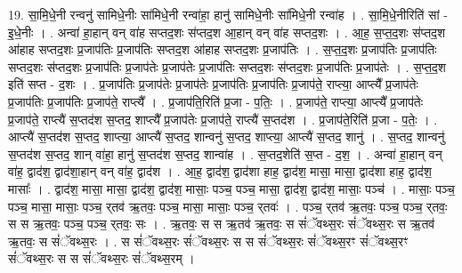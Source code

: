 \documentclass[17pt]{extarticle}
\begin{document}
19. सा॒मि॒धे॒नी रन्वनु॑ सामिधे॒नीः सा॑मिधे॒नी रन्वा॑हा॒ हानु॑ सामिधे॒नीः सा॑मिधे॒नी रन्वा॑ह । . सा॒मि॒धे॒नीरिति॑ सां - इ॒धे॒नीः । . अन्वा॑ हा॒हान् वन् वा॑ह सप्तद॒शः स॑प्तद॒श आ॒हान् वन् वा॑ह सप्तद॒शः । . आ॒ह॒ स॒प्त॒द॒शः स॑प्तद॒श आ॑हाह सप्तद॒शः प्र॒जाप॑तिः प्र॒जाप॑तिः सप्तद॒श आ॑हाह सप्तद॒शः प्र॒जाप॑तिः । . स॒प्त॒द॒शः प्र॒जाप॑तिः प्र॒जाप॑तिः सप्तद॒शः स॑प्तद॒शः प्र॒जाप॑तिः प्र॒जाप॑तेः प्र॒जाप॑तेः प्र॒जाप॑तिः सप्तद॒शः स॑प्तद॒शः प्र॒जाप॑तिः प्र॒जाप॑तेः । . स॒प्त॒द॒श इति॑ सप्त - द॒शः । . प्र॒जाप॑तिः प्र॒जाप॑तेः प्र॒जाप॑तेः प्र॒जाप॑तिः प्र॒जाप॑तिः प्र॒जाप॑ते॒ राप्त्या॒ आप्त्यै᳚ प्र॒जाप॑तेः प्र॒जाप॑तिः प्र॒जाप॑तिः प्र॒जाप॑ते॒ राप्त्यै᳚ । . प्र॒जाप॑ति॒रिति॑ प्र॒जा - प॒तिः॒ । . प्र॒जाप॑ते॒ राप्त्या॒ आप्त्यै᳚ प्र॒जाप॑तेः प्र॒जाप॑ते॒ राप्त्यै॑ स॒प्तद॑श स॒प्तद॒ शाप्त्यै᳚ प्र॒जाप॑तेः प्र॒जाप॑ते॒ राप्त्यै॑ स॒प्तद॑श । . प्र॒जाप॑ते॒रिति॑ प्र॒जा - प॒तेः॒ । . आप्त्यै॑ स॒प्तद॑श स॒प्तद॒ शाप्त्या॒ आप्त्यै॑ स॒प्तद॒ शान्वनु॑ स॒प्तद॒ शाप्त्या॒ आप्त्यै॑ स॒प्तद॒ शानु॑ । . स॒प्तद॒ शान्वनु॑ स॒प्तद॑श स॒प्तद॒ शान् वा॑हा॒ हानु॑ स॒प्तद॑श स॒प्तद॒ शान्वा॑ह । . स॒प्तद॒शेति॑ स॒प्त - द॒श॒ । . अन्वा॑ हा॒हान् वन् वा॑ह॒ द्वाद॑श॒ द्वाद॑शा॒हान् वन् वा॑ह॒ द्वाद॑श । . आ॒ह॒ द्वाद॑श॒ द्वाद॑शा हाह॒ द्वाद॑श॒ मासा॒ मासा॒ द्वाद॑शा हाह॒ द्वाद॑श॒ मासाः᳚ । . द्वाद॑श॒ मासा॒ मासा॒ द्वाद॑श॒ द्वाद॑श॒ मासाः॒ पञ्च॒ पञ्च॒ मासा॒ द्वाद॑श॒ द्वाद॑श॒ मासाः॒ पञ्च॑ । . मासाः॒ पञ्च॒ पञ्च॒ मासा॒ मासाः॒ पञ्च॒ र्‌तव॑ ऋ॒तवः॒ पञ्च॒ मासा॒ मासाः॒ पञ्च॒ र्‌तवः॑ । . पञ्च॒ र्‌तव॑ ऋ॒तवः॒ पञ्च॒ पञ्च॒ र्‌तवः॒ स स ऋ॒तवः॒ पञ्च॒ पञ्च॒ र्‌तवः॒ सः । . ऋ॒तवः॒ स स ऋ॒तव॑ ऋ॒तवः॒ स सं॑ॅवथ्स॒रः सं॑ॅवथ्स॒रः स ऋ॒तव॑ ऋ॒तवः॒ स सं॑ॅवथ्स॒रः । . स सं॑ॅवथ्स॒रः सं॑ॅवथ्स॒रः स स सं॑ॅवथ्स॒रः सं॑ॅवथ्स॒रꣳ सं॑ॅवथ्स॒रꣳ सं॑ॅवथ्स॒रः स स सं॑ॅवथ्स॒रः सं॑ॅवथ्स॒रम् । \newline
\end{document}
